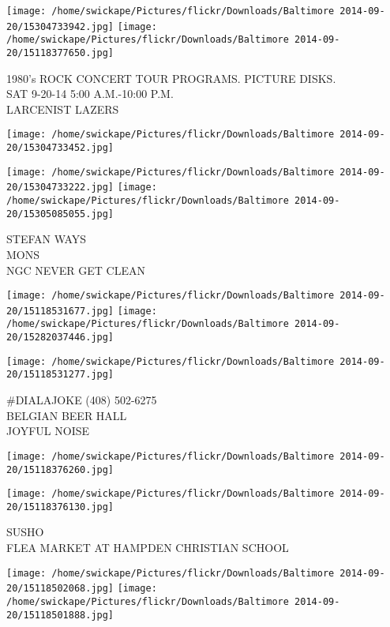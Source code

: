 \documentclass[10pt,letterpaper]{article}
\begin{document}
\vspace{0.25in}
\texttt{[image: /home/swickape/Pictures/flickr/Downloads/Baltimore 2014-09-20/15304733942.jpg]}
\texttt{[image: /home/swickape/Pictures/flickr/Downloads/Baltimore 2014-09-20/15118377650.jpg]}

1980's ROCK CONCERT TOUR PROGRAMS.  PICTURE DISKS.\\
SAT 9{-}20{-}14 5:00 A.M.{-}10:00 P.M.\\
LARCENIST LAZERS
\pagebreak

\texttt{[image: /home/swickape/Pictures/flickr/Downloads/Baltimore 2014-09-20/15304733452.jpg]}

\vspace{0.25in}
\texttt{[image: /home/swickape/Pictures/flickr/Downloads/Baltimore 2014-09-20/15304733222.jpg]}
\texttt{[image: /home/swickape/Pictures/flickr/Downloads/Baltimore 2014-09-20/15305085055.jpg]}

STEFAN WAYS\\
MONS\\
NGC NEVER GET CLEAN
\pagebreak

\texttt{[image: /home/swickape/Pictures/flickr/Downloads/Baltimore 2014-09-20/15118531677.jpg]}
\texttt{[image: /home/swickape/Pictures/flickr/Downloads/Baltimore 2014-09-20/15282037446.jpg]}

\texttt{[image: /home/swickape/Pictures/flickr/Downloads/Baltimore 2014-09-20/15118531277.jpg]}

\#DIALAJOKE (408) 502{-}6275\\
BELGIAN BEER HALL\\
JOYFUL NOISE
\pagebreak

\texttt{[image: /home/swickape/Pictures/flickr/Downloads/Baltimore 2014-09-20/15118376260.jpg]}

\vspace{0.25in}
\texttt{[image: /home/swickape/Pictures/flickr/Downloads/Baltimore 2014-09-20/15118376130.jpg]}

SUSHO\\
FLEA MARKET AT HAMPDEN CHRISTIAN SCHOOL
\pagebreak

\texttt{[image: /home/swickape/Pictures/flickr/Downloads/Baltimore 2014-09-20/15118502068.jpg]}
\texttt{[image: /home/swickape/Pictures/flickr/Downloads/Baltimore 2014-09-20/15118501888.jpg]}
\end{document}
